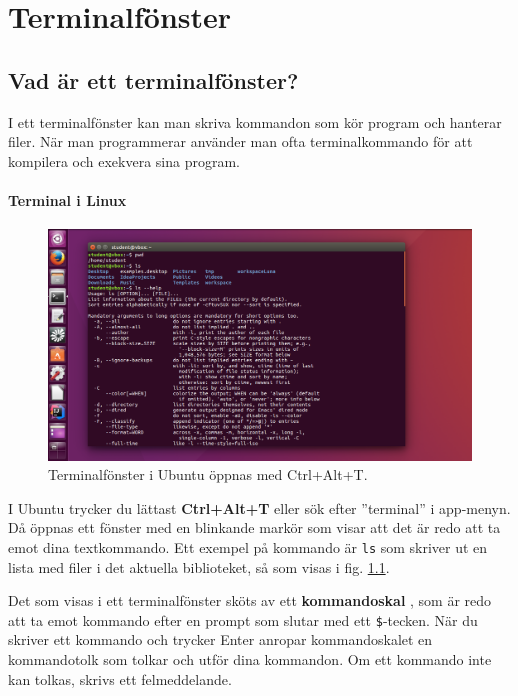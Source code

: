 
\chapter{Terminalfönster}\label{appendix:terminal}

\section{Vad är ett terminalfönster?}

I ett terminalfönster kan man skriva kommandon som kör program och hanterar filer. När man programmerar använder man ofta terminalkommando för att kompilera och exekvera sina program.  
 
\subsubsection{Terminal i Linux}

    \begin{figure}[!b]
    \centering
    \includegraphics[width=1.0\textwidth]{../img/linux-terminal.png}
    \caption{Terminalfönster i Ubuntu öppnas med Ctrl+Alt+T.}
    \label{fig:terminal:linux}
    \end{figure}

I Ubuntu trycker du lättast \textbf{Ctrl+Alt+T} eller sök efter ''terminal'' i app-menyn.  Då öppnas ett fönster med en blinkande markör som visar att det är redo att ta emot dina textkommando. Ett exempel på kommando är \texttt{ls} som skriver ut en lista med filer i det aktuella biblioteket, så som visas i fig. \ref{fig:terminal:linux}.

Det som visas i ett terminalfönster sköts av ett \textbf{kommandoskal} , som är redo att ta emot kommando efter en prompt som slutar med ett \texttt{\$}-tecken. När du skriver ett kommando och trycker Enter anropar kommandoskalet en kommandotolk som tolkar och utför dina kommandon. Om ett kommando inte kan tolkas, skrivs ett felmeddelande. 

